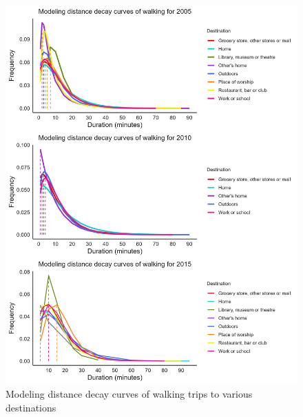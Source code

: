 \documentclass[
11pt, %
oneside, %
english, %
singlespacing, %
]{macthesis} %
\begin{document}
\begin{figure}

{\centering \includegraphics[width=1\linewidth]{figure/ch03_fig_12} 

}

\caption{Modeling distance decay curves of walking trips to various destinations}\label{fig:ch03-plot-fig-12}
\end{figure}
\end{document}
